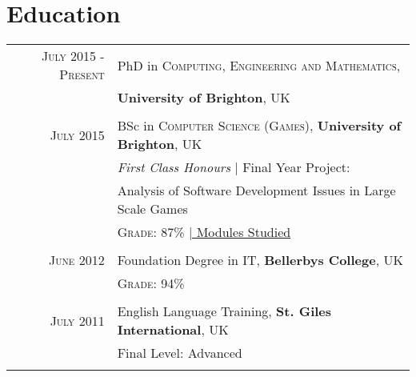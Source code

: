\documentclass[a4paper,10pt]{article} %
\begin{document}

\section{Education}

\begin{tabular}{r|p{11cm}}
\textsc{July 2015 - Present} & PhD in \textsc{Computing, Engineering and Mathematics},\\
& \textbf{University of Brighton}, UK\\
\multicolumn{2}{c}{} \\

	
\textsc{July} 2015 & BSc in \textsc{Computer Science (Games)}, \textbf{University of Brighton}, UK\\
& \small\emph{First Class Honours} | Final Year Project: \\
& Analysis of Software Development Issues in Large Scale Games\\
&\normalsize \textsc{Grade}: 87\% \hyperlink{grds}{\hfill | \footnotesize Modules Studied}\\
\multicolumn{2}{c}{} \\


\textsc{June} 2012 & Foundation Degree in \textsc{IT}, \normalsize\textbf{Bellerbys College}, UK\\
&\normalsize \textsc{Grade}: 94\% \\
\multicolumn{2}{c}{} \\


\textsc{July} 2011 & English Language Training, \textbf{St. Giles International}, UK \\
& Final Level: Advanced\\
\multicolumn{2}{c}{} \\

\end{tabular}
\vspace{1cm}

\end{document}
